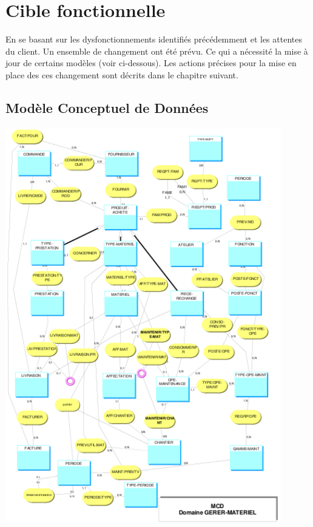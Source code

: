 \section{Cible fonctionnelle}

    En se basant sur les dysfonctionnements identifiés précédemment et les attentes du client. Un ensemble de changement ont été prévu. Ce qui a nécessité la mise à jour de certains modèles (voir ci-dessous). Les actions précises pour la mise en place des ces changement sont décrits dans le chapitre suivant.

    \subsection{Modèle Conceptuel de Données}
        \includegraphics[width=0.9\textwidth]{img/MCD.png}

